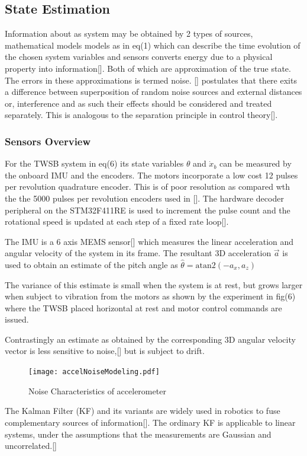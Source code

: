     \subsection{State Estimation}
    Information about as system may be obtained by 2 types of sources, 
    mathematical models models as in eq(1) which can describe the time evolution of the chosen system variables 
    and sensors converts energy due to a physical property into information[]. Both of which are approximation of the true state. 
    The errors in these approximations is termed noise. [] postulates that there exits a difference between superposition 
    of random noise sources and external distances or, interference and as such their effects should be considered and treated separately.
    This is analogous to the separation principle in control theory[]. 

    \subsubsection{Sensors Overview}
        For the TWSB system in eq(6) its state variables $\theta$ and $\dot x_b$ can be measured by the onboard IMU and the encoders.
        The motors incorporate a low cost 12 pulses per revolution quadrature encoder. This is of poor resolution as compared wth the
        the 5000 pulses per revolution encoders used in []. The hardware decoder peripheral on the STM32F411RE
        is used to increment the pulse count and the rotational speed is updated at each step of a fixed rate loop[].
        
        The IMU is a 6 axis MEMS sensor[] which measures the linear acceleration and angular velocity of the system in its frame. 
        The resultant 3D acceleration $\vec{a}$ is used to obtain an 
        estimate of the pitch angle as $\hat{\theta} = \mathrm{atan2}\left(-a_x ,a_z \right)$

        The variance of this estimate is small when the system is at rest, but grows larger when subject to vibration from the motors
        as shown by the experiment in fig(6) where the TWSB placed horizontal at rest and motor control commands are issued. 
        
        Contrastingly an estimate as obtained by the corresponding 3D angular velocity vector is less sensitive to noise,[] 
        but is subject to drift. 
        \begin{figure}[H]
            \centering
            \texttt{[image: accelNoiseModeling.pdf]}
            \caption{Noise Characteristics of accelerometer}
        \end{figure}
        The Kalman Filter (KF) and its variants are widely used in robotics to fuse 
        complementary sources of information[]. 
        The ordinary KF is applicable to linear systems, under the assumptions that the
        measurements are Gaussian and uncorrelated.[]


